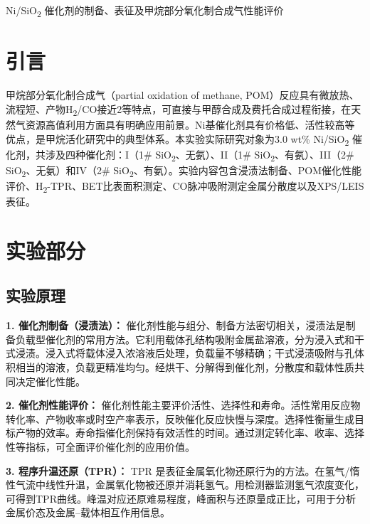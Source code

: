 \documentclass[a4paper]{article}
\newcommand{\zihaoSan}{\fontsize{16pt}{24pt}\selectfont}
\newcommand{\zihaoWu}{\fontsize{10.5pt}{16pt}\selectfont}
\begin{document}
\zihaoWu

\begin{center}
	{\zihaoSan\heiti Ni/SiO\textsubscript{2} 催化剂的制备、表征及甲烷部分氧化制合成气性能评价}
\end{center}

\vspace{6pt}

\section{引言} \vspace{-0.5em}

甲烷部分氧化制合成气（partial oxidation of methane, POM）反应具有微放热、流程短、产物H\textsubscript{2}/CO接近2等特点，可直接与甲醇合成及费托合成过程衔接，在天然气资源高值利用方面具有明确应用前景。Ni基催化剂具有价格低、活性较高等优点，是甲烷活化研究中的典型体系。本实验实际研究对象为3.0 wt\% Ni/SiO\textsubscript{2} 催化剂，共涉及四种催化剂：I（1\# SiO\textsubscript{2}、无氨）、II（1\# SiO\textsubscript{2}、有氨）、III（2\# SiO\textsubscript{2}、无氨）和IV（2\# SiO\textsubscript{2}、有氨）。实验内容包含浸渍法制备、POM催化性能评价、H\textsubscript{2}-TPR、BET比表面积测定、CO脉冲吸附测定金属分散度以及XPS/LEIS表征。

\section{实验部分} \vspace{-0.5em}

\subsection{实验原理}

\textbf{1. 催化剂制备（浸渍法）：} 催化剂性能与组分、制备方法密切相关，浸渍法是制备负载型催化剂的常用方法。它利用载体孔结构吸附金属盐溶液，分为浸入式和干式浸渍。浸入式将载体浸入浓溶液后处理，负载量不够精确；干式浸渍吸附与孔体积相当的溶液，负载更精准均匀。经烘干、分解得到催化剂，分散度和载体性质共同决定催化性能。

\textbf{2. 催化剂性能评价：} 催化剂性能主要评价活性、选择性和寿命。活性常用反应物转化率、产物收率或时空产率表示，反映催化反应快慢与深度。选择性衡量生成目标产物的效率。寿命指催化剂保持有效活性的时间。通过测定转化率、收率、选择性等指标，可全面评价催化剂的应用价值。

\textbf{3. 程序升温还原（TPR）：} TPR 是表征金属氧化物还原行为的方法。在氢气/惰性气流中线性升温，金属氧化物被还原并消耗氢气。用检测器监测氢气浓度变化，可得到TPR曲线。峰温对应还原难易程度，峰面积与还原量成正比，可用于分析金属价态及金属--载体相互作用信息。
\end{document}

